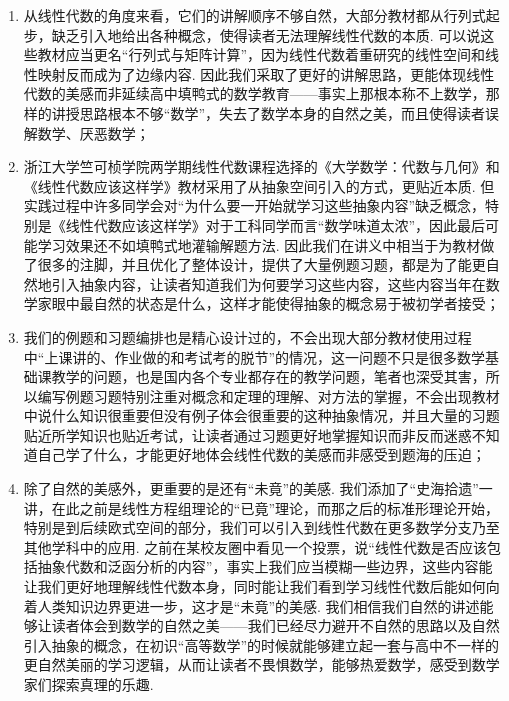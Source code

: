 \begin{enumerate}
    \item 从线性代数的角度来看，它们的讲解顺序不够自然，大部分教材都从行列式起步，缺乏引入地给出各种概念，使得读者无法理解线性代数的本质. 可以说这些教材应当更名``行列式与矩阵计算''，因为线性代数着重研究的线性空间和线性映射反而成为了边缘内容. 因此我们采取了更好的讲解思路，更能体现线性代数的美感而非延续高中填鸭式的数学教育——事实上那根本称不上数学，那样的讲授思路根本不够``数学''，失去了数学本身的自然之美，而且使得读者误解数学、厌恶数学；

    \item 浙江大学竺可桢学院两学期线性代数课程选择的《大学数学：代数与几何》和《线性代数应该这样学》教材采用了从抽象空间引入的方式，更贴近本质. 但实践过程中许多同学会对``为什么要一开始就学习这些抽象内容''缺乏概念，特别是《线性代数应该这样学》对于工科同学而言``数学味道太浓''，因此最后可能学习效果还不如填鸭式地灌输解题方法. 因此我们在讲义中相当于为教材做了很多的注脚，并且优化了整体设计，提供了大量例题习题，都是为了能更自然地引入抽象内容，让读者知道我们为何要学习这些内容，这些内容当年在数学家眼中最自然的状态是什么，这样才能使得抽象的概念易于被初学者接受；

    \item 我们的例题和习题编排也是精心设计过的，不会出现大部分教材使用过程中``上课讲的、作业做的和考试考的脱节''的情况，这一问题不只是很多数学基础课教学的问题，也是国内各个专业都存在的教学问题，笔者也深受其害，所以编写例题习题特别注重对概念和定理的理解、对方法的掌握，不会出现教材中说什么知识很重要但没有例子体会很重要的这种抽象情况，并且大量的习题贴近所学知识也贴近考试，让读者通过习题更好地掌握知识而非反而迷惑不知道自己学了什么，才能更好地体会线性代数的美感而非感受到题海的压迫；

    \item 除了自然的美感外，更重要的是还有``未竟''的美感. 我们添加了``史海拾遗''一讲，在此之前是线性方程组理论的``已竟''理论，而那之后的标准形理论开始，特别是到后续欧式空间的部分，我们可以引入到线性代数在更多数学分支乃至其他学科中的应用. 之前在某校友圈中看见一个投票，说``线性代数是否应该包括抽象代数和泛函分析的内容''，事实上我们应当模糊一些边界，这些内容能让我们更好地理解线性代数本身，同时能让我们看到学习线性代数后能如何向着人类知识边界更进一步，这才是``未竟''的美感. 我们相信我们自然的讲述能够让读者体会到数学的自然之美——我们已经尽力避开不自然的思路以及自然引入抽象的概念，在初识``高等数学''的时候就能够建立起一套与高中不一样的更自然美丽的学习逻辑，从而让读者不畏惧数学，能够热爱数学，感受到数学家们探索真理的乐趣.
\end{enumerate}

